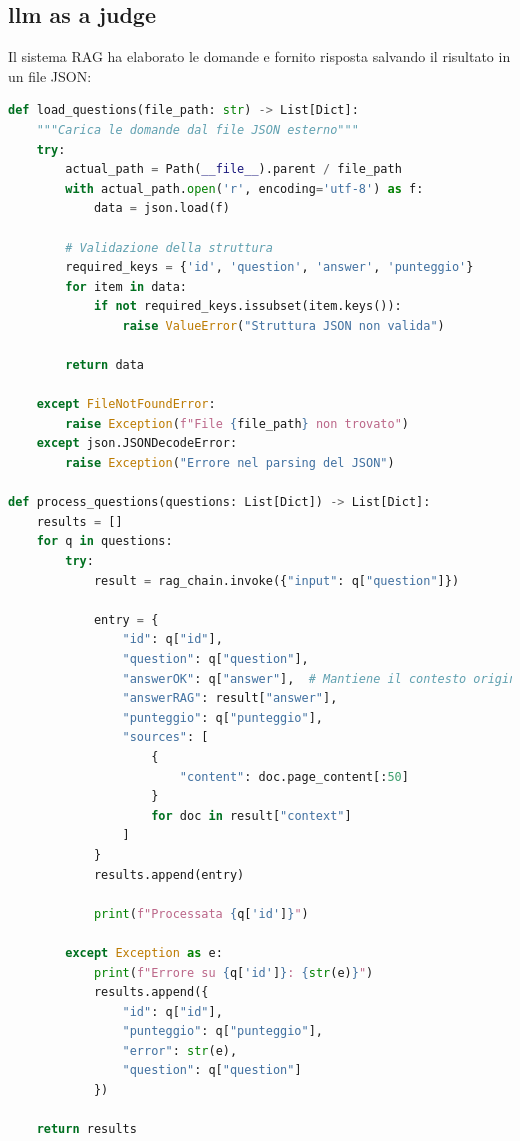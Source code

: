 \documentclass[12pt,a4paper,openright,twoside]{book}
\begin{document}
\subsection{llm as a judge}
Il sistema RAG ha elaborato le domande e fornito risposta salvando il risultato in un file JSON:
\begin{lstlisting}[language=Python, caption={Codice aggiunto alla pipeline per elaborare massivamente le domande}, label={lst:chunking}, inputencoding=utf8]
def load_questions(file_path: str) -> List[Dict]:
    """Carica le domande dal file JSON esterno"""
    try:
        actual_path = Path(__file__).parent / file_path
        with actual_path.open('r', encoding='utf-8') as f:
            data = json.load(f)
            
        # Validazione della struttura
        required_keys = {'id', 'question', 'answer', 'punteggio'}
        for item in data:
            if not required_keys.issubset(item.keys()):
                raise ValueError("Struttura JSON non valida")
                
        return data
        
    except FileNotFoundError:
        raise Exception(f"File {file_path} non trovato")
    except json.JSONDecodeError:
        raise Exception("Errore nel parsing del JSON")

def process_questions(questions: List[Dict]) -> List[Dict]:
    results = []
    for q in questions:
        try:
            result = rag_chain.invoke({"input": q["question"]})
            
            entry = {
                "id": q["id"],
                "question": q["question"],
                "answerOK": q["answer"],  # Mantiene il contesto originale
                "answerRAG": result["answer"],
                "punteggio": q["punteggio"],
                "sources": [
                    {
                        "content": doc.page_content[:50]
                    } 
                    for doc in result["context"]
                ]
            }
            results.append(entry)
            
            print(f"Processata {q['id']}")
            
        except Exception as e:
            print(f"Errore su {q['id']}: {str(e)}")
            results.append({
                "id": q["id"],
                "punteggio": q["punteggio"],
                "error": str(e),
                "question": q["question"]
            })
    
    return results

\end{lstlisting}
\end{document}
